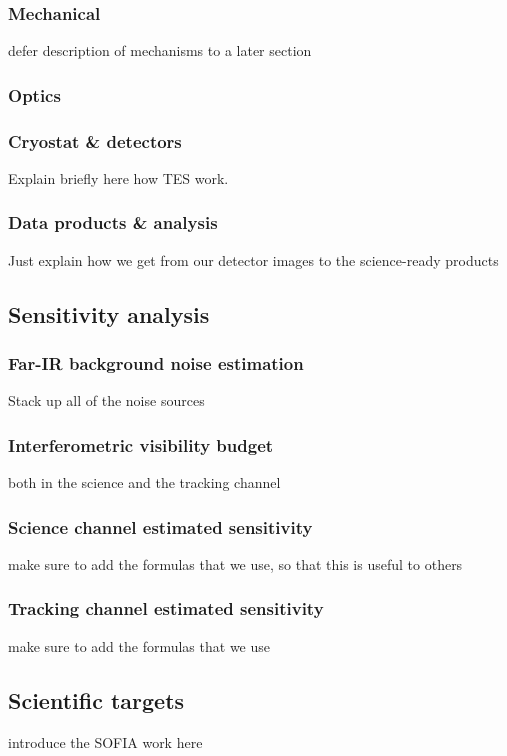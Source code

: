 \subsubsection{Mechanical}
defer description of mechanisms to a later section
\subsubsection{Optics}

\subsubsection{Cryostat \& detectors}

Explain briefly here how TES work.

\subsubsection{Data products \& analysis}
Just explain how we get from our detector images to the science-ready products

\subsection{Sensitivity analysis}

\subsubsection{Far-IR background noise estimation}
Stack up all of the noise sources
\subsubsection{Interferometric visibility budget}
both in the science and the tracking channel
\subsubsection{Science channel estimated sensitivity}
make sure to add the formulas that we use, so that this is useful to others

\subsubsection{Tracking channel estimated sensitivity}
make sure to add the formulas that we use

\subsection{Scientific targets}

introduce the SOFIA work here